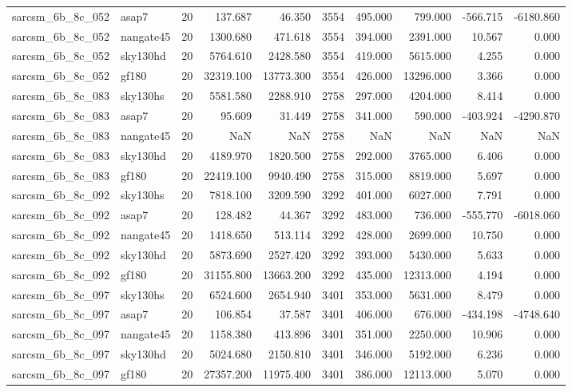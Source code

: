\documentclass{article}
\begin{document}
\begin{longtable}{llrrrrrrrr}
sarcsm\_6b\_8c\_052 & asap7 & 20 & 137.687 & 46.350 & 3554 & 495.000 & 799.000 & -566.715 & -6180.860 \\
sarcsm\_6b\_8c\_052 & nangate45 & 20 & 1300.680 & 471.618 & 3554 & 394.000 & 2391.000 & 10.567 & 0.000 \\
sarcsm\_6b\_8c\_052 & sky130hd & 20 & 5764.610 & 2428.580 & 3554 & 419.000 & 5615.000 & 4.255 & 0.000 \\
sarcsm\_6b\_8c\_052 & gf180 & 20 & 32319.100 & 13773.300 & 3554 & 426.000 & 13296.000 & 3.366 & 0.000 \\
sarcsm\_6b\_8c\_083 & sky130hs & 20 & 5581.580 & 2288.910 & 2758 & 297.000 & 4204.000 & 8.414 & 0.000 \\
sarcsm\_6b\_8c\_083 & asap7 & 20 & 95.609 & 31.449 & 2758 & 341.000 & 590.000 & -403.924 & -4290.870 \\
sarcsm\_6b\_8c\_083 & nangate45 & 20 & NaN & NaN & 2758 & NaN & NaN & NaN & NaN \\
sarcsm\_6b\_8c\_083 & sky130hd & 20 & 4189.970 & 1820.500 & 2758 & 292.000 & 3765.000 & 6.406 & 0.000 \\
sarcsm\_6b\_8c\_083 & gf180 & 20 & 22419.100 & 9940.490 & 2758 & 315.000 & 8819.000 & 5.697 & 0.000 \\
sarcsm\_6b\_8c\_092 & sky130hs & 20 & 7818.100 & 3209.590 & 3292 & 401.000 & 6027.000 & 7.791 & 0.000 \\
sarcsm\_6b\_8c\_092 & asap7 & 20 & 128.482 & 44.367 & 3292 & 483.000 & 736.000 & -555.770 & -6018.060 \\
sarcsm\_6b\_8c\_092 & nangate45 & 20 & 1418.650 & 513.114 & 3292 & 428.000 & 2699.000 & 10.750 & 0.000 \\
sarcsm\_6b\_8c\_092 & sky130hd & 20 & 5873.690 & 2527.420 & 3292 & 393.000 & 5430.000 & 5.633 & 0.000 \\
sarcsm\_6b\_8c\_092 & gf180 & 20 & 31155.800 & 13663.200 & 3292 & 435.000 & 12313.000 & 4.194 & 0.000 \\
sarcsm\_6b\_8c\_097 & sky130hs & 20 & 6524.600 & 2654.940 & 3401 & 353.000 & 5631.000 & 8.479 & 0.000 \\
sarcsm\_6b\_8c\_097 & asap7 & 20 & 106.854 & 37.587 & 3401 & 406.000 & 676.000 & -434.198 & -4748.640 \\
sarcsm\_6b\_8c\_097 & nangate45 & 20 & 1158.380 & 413.896 & 3401 & 351.000 & 2250.000 & 10.906 & 0.000 \\
sarcsm\_6b\_8c\_097 & sky130hd & 20 & 5024.680 & 2150.810 & 3401 & 346.000 & 5192.000 & 6.236 & 0.000 \\
sarcsm\_6b\_8c\_097 & gf180 & 20 & 27357.200 & 11975.400 & 3401 & 386.000 & 12113.000 & 5.070 & 0.000 \\

\end{longtable}
\end{document}
